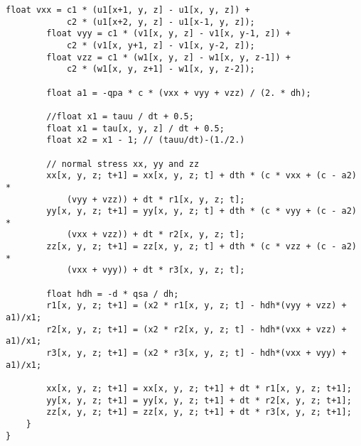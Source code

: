 \begin{lstlisting}[language=stencil]
		float vxx = c1 * (u1[x+1, y, z] - u1[x, y, z]) +
			c2 * (u1[x+2, y, z] - u1[x-1, y, z]);
		float vyy = c1 * (v1[x, y, z] - v1[x, y-1, z]) +
			c2 * (v1[x, y+1, z] - v1[x, y-2, z]);
		float vzz = c1 * (w1[x, y, z] - w1[x, y, z-1]) +
			c2 * (w1[x, y, z+1] - w1[x, y, z-2]);

		float a1 = -qpa * c * (vxx + vyy + vzz) / (2. * dh);

		//float x1 = tauu / dt + 0.5;
		float x1 = tau[x, y, z] / dt + 0.5;
		float x2 = x1 - 1; // (tauu/dt)-(1./2.)

		// normal stress xx, yy and zz
		xx[x, y, z; t+1] = xx[x, y, z; t] + dth * (c * vxx + (c - a2) *
			(vyy + vzz)) + dt * r1[x, y, z; t];
		yy[x, y, z; t+1] = yy[x, y, z; t] + dth * (c * vyy + (c - a2) *
			(vxx + vzz)) + dt * r2[x, y, z; t];
		zz[x, y, z; t+1] = zz[x, y, z; t] + dth * (c * vzz + (c - a2) *
			(vxx + vyy)) + dt * r3[x, y, z; t];

		float hdh = -d * qsa / dh;
		r1[x, y, z; t+1] = (x2 * r1[x, y, z; t] - hdh*(vyy + vzz) + a1)/x1;
		r2[x, y, z; t+1] = (x2 * r2[x, y, z; t] - hdh*(vxx + vzz) + a1)/x1;
		r3[x, y, z; t+1] = (x2 * r3[x, y, z; t] - hdh*(vxx + vyy) + a1)/x1;

		xx[x, y, z; t+1] = xx[x, y, z; t+1] + dt * r1[x, y, z; t+1];
		yy[x, y, z; t+1] = yy[x, y, z; t+1] + dt * r2[x, y, z; t+1];
		zz[x, y, z; t+1] = zz[x, y, z; t+1] + dt * r3[x, y, z; t+1];
	}
}
\end{lstlisting}


